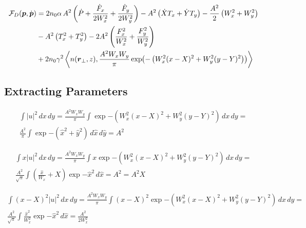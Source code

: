 \begin{equation}
    \begin{split}
    \mathcal{F}_{D}(\vect{p},\dot{\vect{p}}) & = 2 n_0 \alpha\, A^2 \left(\dot{P}  + \frac{\dot{F}_{x} }{2W_{x}^2} + \frac{\dot{F}_{y}}{2W_{y}^2} \right) - A^2 \left(\dot{X}T_x + \dot{Y} T_y\right)  - \frac{A^2}{2} \left(W_x^2+ W_y^2\right) \\
        &- A^2 \left(T_x^2 + T_y^2 \right) - 2 A^2 \left(\frac{F_{x}^2}{W_{x}^2} + \frac{F_{y}^2}{W_{y}^2}\right) \\
        &+ 2n_0 \gamma^2 \left<n(\vect{r}_{\perp},z), \frac{A^2W_x W_y}{\pi} \exp{-\left( W_x^2(x-X)^2 + W_y^2(y-Y)^2 \right)}\right>
    \end{split}
\end{equation}


\subsection{Extracting Parameters}

\begin{equation}
\begin{split}
\int |u|^2 \,dx\,dy = \frac{A^2W_x W_y}{\pi} \int \exp{-\left( W_x^2(x-X)^2 + W_y^2(y-Y)^2 \right)}\,dx\,dy = \\
\frac{A^2}{\pi}\int \exp{-\left( \hat{x}^2 + \hat{y}^2 \right)}\,d\hat{x}\,d\hat{y} = A^2 
\end{split}
\end{equation}


\begin{equation}
\begin{split}
\int x |u|^2 \,dx\,dy = \frac{A^2W_x W_y}{\pi} \int x \exp{-\left( W_x^2(x-X)^2 + W_y^2(y-Y)^2 \right)}\,dx\,dy = \\
\frac{A^2}{\sqrt{\pi}} \int (\frac{\hat{x}}{W_x} + X) \exp{-\hat{x}^2 }\,d\hat{x} = A^2 = A^2 X
\end{split}
\end{equation}

\begin{equation}
\begin{split}
\int (x-X)^2 |u|^2 \,dx\,dy = \frac{A^2W_x W_y}{\pi} \int  (x-X)^2 \exp{-\left( W_x^2(x-X)^2 + W_y^2(y-Y)^2 \right)}\,dx\,dy = \\
\frac{A^2}{\sqrt{\pi}} \int \frac{\hat{x}^2}{W_x^2} \exp{-\hat{x}^2 }\,d\hat{x} = \frac{A^2}{2 W_x^2}
\end{split}
\end{equation}


